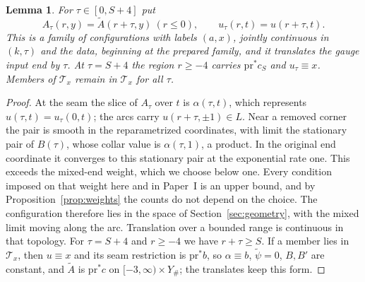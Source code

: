 \documentclass[11pt]{amsart}
\newtheorem{lemma}[theorem]{Lemma}
\theoremstyle{definition}
\theoremstyle{remark}
\theoremstyle{plain}
\numberwithin{equation}{section}
\begin{document}
\begin{lemma}\label{lem:shift}
For $\tau\in[0,S+4]$ put
\[
 A_\tau(r,y)=\widetilde A(r+\tau,y)\ (r\le0),\qquad
 u_\tau(r,t)=u(r+\tau,t).
\]
This is a family of configurations with labels $(a,x)$, jointly continuous
in $(k,\tau)$ and the data, beginning at the prepared family, and it
translates the gauge input end by $\tau$. At $\tau=S+4$ the region
$r\ge-4$ carries $\mathrm{pr}^*c_S$ and $u_\tau\equiv x$. Members of $\mathcal T_x$
remain in $\mathcal T_x$ for all $\tau$.
\end{lemma}
\begin{proof}
At the seam the slice of $A_\tau$ over $t$ is $\alpha(\tau,t)$, which represents
$u(\tau,t)=u_\tau(0,t)$; the arcs carry $u(r+\tau,\pm1)\in L$. Near a
removed corner the pair is smooth in the reparametrized coordinates, with
limit the stationary pair of $B(\tau)$, whose collar value is $\alpha(\tau,1)$,
a product. In the original end coordinate it converges to this stationary
pair at the exponential rate one. This exceeds the mixed-end weight,
which we choose below one. Every condition imposed on that weight here
and in Paper~I is an upper bound, and by Proposition~\ref{prop:weights}
the counts do not depend on the choice. The
configuration therefore lies in the space of Section~\ref{sec:geometry}, with
the mixed limit moving along the arc. Translation over a bounded range is
continuous in that topology. For $\tau=S+4$ and $r\ge-4$ we have $r+\tau\ge S$.
If a member lies in $\mathcal T_x$, then $u\equiv x$ and its seam restriction
is $\mathrm{pr}^*b$, so $\alpha\equiv b$, $\widetilde\psi=0$, $B,B'$ are constant,
and $\widetilde A$ is $\mathrm{pr}^*c$ on $[-3,\infty)\times Y_\#$; the translates
keep this form.
\end{proof}
\end{document}
